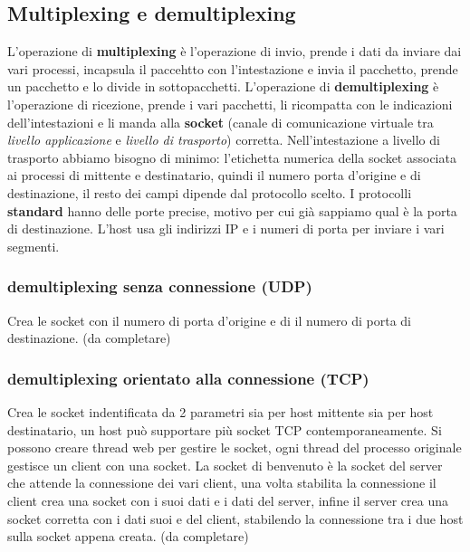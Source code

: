 \subsection{Multiplexing e demultiplexing}
L'operazione di \textbf{multiplexing} è l'operazione di invio, prende i dati da inviare dai vari processi, incapsula il paccehtto con l'intestazione e invia il pacchetto, prende un pacchetto e lo divide in sottopacchetti.
L'operazione di \textbf{demultiplexing} è l'operazione di ricezione, prende i vari pacchetti, li ricompatta con le indicazioni dell'intestazioni e li manda alla \textbf{socket} (canale di comunicazione virtuale tra \textit{livello applicazione} e \textit{livello di trasporto}) corretta. \newline
Nell'intestazione a livello di trasporto abbiamo bisogno di minimo: l'etichetta numerica della socket associata ai processi di mittente e destinatario, quindi il numero porta d'origine e di destinazione, il resto dei campi dipende dal protocollo scelto. \newline
I protocolli \textbf{standard} hanno delle porte precise, motivo per cui già sappiamo qual è la porta di destinazione.
L'host usa gli indirizzi IP e i numeri di porta per inviare i vari segmenti. \newline

\subsubsection{demultiplexing senza connessione (UDP)}
Crea le socket con il numero di porta d'origine e di il numero di porta di destinazione. \newline
(da completare)

\subsubsection{demultiplexing orientato alla connessione (TCP)}
Crea le socket indentificata da 2 parametri sia per host mittente sia per host destinatario, un host può supportare più socket TCP contemporaneamente. \newline
Si possono creare thread web per gestire le socket, ogni thread del processo originale gestisce un client con una socket. 
La socket di benvenuto è la socket del server che attende la connessione dei vari client, una volta stabilita la connessione il client crea una socket con i suoi dati e i dati del server, infine il server crea una socket corretta con i dati suoi e del client, stabilendo la connessione tra i due host sulla socket appena creata. \newline
(da completare)

